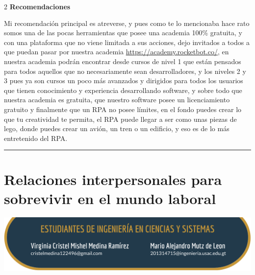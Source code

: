 \documentclass[12pt,spanish,Letterpaper,openany]{book}
\newcommand{\HRule}{\begin{center}\rule{0.5\linewidth}{0.2mm}\end{center}}
\begin{document}
\begin {multicols}{2}
\textbf{Recomendaciones}

Mi recomendación principal es atreverse, y pues como te lo mencionaba hace rato somos una de las pocas herramientas que posee una academia 100\% gratuita, y con una plataforma que no viene limitada a sus acciones, dejo invitados a todos a que puedan pasar por nuestra academia \url{https://academy.rocketbot.co/}, en nuestra academia podrán encontrar desde cursos de nivel 1 que están pensados para todos aquellos que no necesariamente sean desarrolladores, y los niveles 2 y 3 pues ya son cursos un poco más avanzados y dirigidos para todos los usuarios que tienen conocimiento y experiencia desarrollando software, y sobre todo que nuestra academia es gratuita, que nuestro software posee un licenciamiento gratuito y finalmente que un RPA no posee límites, en el fondo puedes crear lo que tu creatividad te permita, el RPA puede llegar a ser como unas piezas de lego, donde puedes crear un avión, un tren o un edificio, y eso es de lo más entretenido del RPA.

\end {multicols}
\medskip
\HRule
\medskip

\hypertarget{pareja17}{%
\chapter{Relaciones interpersonales para sobrevivir en el mundo laboral}\label{pareja17}}

\begin{center}\includegraphics[width=1\linewidth]{images/pareja17_image1} \end{center}
\end{document}
